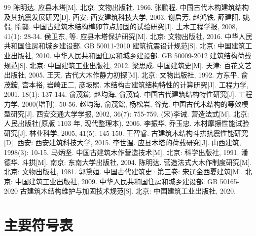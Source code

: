 \documentclass[12pt,a4paper,UTF8]{ctexart}
\begin{document}
\begin{thebibliography}{99}
     陈明达. 应县木塔[M]. 北京: 文物出版社, 1966.
     张鹏程. 中国古代木构建筑结构及其抗震发展研究[D]. 西安: 西安建筑科技大学, 2003.
     谢启芳, 赵鸿铁, 薛建阳, 姚侃, 隋龑. 中国古建筑木结构榫卯节点加固的试验研究[J]. 土木工程学报, 2008, 41(1): 28-34.
     侯卫东, 等. 应县木塔保护研究[M]. 北京: 文物出版社, 2016.
     中华人民共和国住房和城乡建设部. GB 50011-2010 建筑抗震设计规范[S]. 北京: 中国建筑工业出版社, 2010.
     中华人民共和国住房和城乡建设部. GB 50009-2012 建筑结构荷载规范[S]. 北京: 中国建筑工业出版社, 2012.
     梁思成. 中国建筑史[M]. 天津: 百花文艺出版社, 2005.
     王天. 古代大木作静力初探[M]. 北京: 文物出版社, 1992.
     方东平, 俞茂鋐, 宫本裕, 岩崎正二, 彦坂熙. 木结构古建筑结构特性的计算研究[J]. 工程力学, 2001, 18(1): 137-144.
     俞茂鋐, 赵均海, 俞茂锜. 中国古代建筑结构特性研究[J]. 工程力学, 2000(增刊): 50-56.
     赵均海, 俞茂鋐, 杨松岩, 谷尭. 中国古代木结构的等效模型研究[J]. 西安交通大学学报, 2002, 36(7): 755-759.
     (宋)李诫. 营造法式[M]. 北京: 人民出版社(原版 1103 年, 现代整理本), 2006.
     李振华, 乔玉忠. 木材摩擦性能试验研究[J]. 林业科学, 2005, 41(5): 145-150.
     王智睿. 古建筑木结构斗拱抗震性能研究[D]. 西安: 西安建筑科技大学, 2015.
     李世温. 应县木塔的荷载研究[J]. 山西建筑, 1998(3): 10-15.
     马炳坚. 中国古建筑木作营造技术[M]. 北京: 科学出版社, 1991.
     潘德华. 斗拱[M]. 南京: 东南大学出版社, 2004.
     陈明达. 营造法式大木作制度研究[M]. 北京: 文物出版社, 1981.
     郭黛姮. 中国古代建筑史·第三卷: 宋辽金西夏建筑[M]. 北京: 中国建筑工业出版社, 2009.
     中华人民共和国住房和城乡建设部. GB 50165-2020 古建筑木结构维护与加固技术规范[S]. 北京: 中国建筑工业出版社, 2020.
\end{thebibliography}

\appendix

\section{主要符号表}
\label{app:A}
\end{document}
